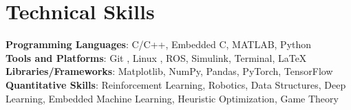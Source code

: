 \documentclass[letterpaper,11pt]{article}
\begin{document}
%
\section{Technical Skills} %
 \begin{itemize}[leftmargin=0.15in, label={}]
 	\small{\item{
\textbf{Programming Languages}{: C/C++, Embedded C, MATLAB, Python \faPython} \\
\textbf{Tools and Platforms}{: Git \faGit*, Linux \faLinux, ROS, Simulink, \faTerminal  Terminal,  \LaTeX} \\
\textbf{Libraries/Frameworks}{: Matplotlib, NumPy, Pandas, PyTorch, TensorFlow} \\
\textbf{Quantitative Skills}{: Reinforcement Learning, Robotics, Data Structures, Deep Learning, Embedded Machine Learning, Heuristic Optimization, Game Theory}

 	}}
 \end{itemize}

 \vspace{-16pt}
\end{document}
